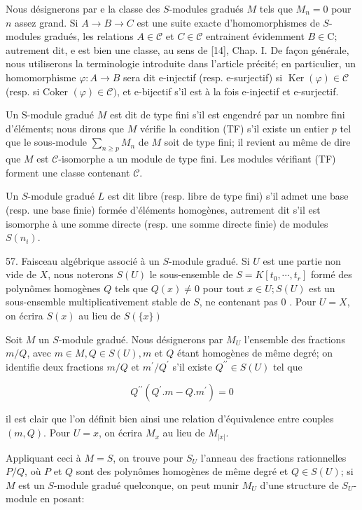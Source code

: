 Nous désignerons par e la classe des $S$-modules gradués $M$ tels que $M_{n}=0$ pour $n$ assez grand. Si $A \rightarrow B \rightarrow C$ est une suite exacte d'homomorphismes de $S$-modules gradués, les relations $A \in \mathcal{C}$ et $C \in \mathcal{C}$ entrainent évidemment $B \in \mathrm{C} ;$ autrement dit, e est bien une classe, au sens de [14], Chap. I. De façon générale, nous utiliserons la terminologie introduite dans l'article précité; en particulier, un homomorphisme $\varphi: A \rightarrow B$ sera dit e-injectif (resp. e-surjectif) si $\operatorname{Ker}(\varphi) \in \mathcal{C}$ (resp. si Coker $(\varphi) \in \mathcal{C})$, et e-bijectif s'il est à la fois e-injectif et e-surjectif.

Un S-module gradué $M$ est dit de type fini s'il est engendré par un nombre fini d'éléments; nous dirons que $M$ vérifie la condition (TF) s'il existe un entier $p$ tel que le sous-module $\sum_{n \geq p} M_{n}$ de $M$ soit de type fini; il revient au même de dire que $M$ est $\mathcal{C}$-isomorphe a un module de type fini. Les modules vérifiant (TF) forment une classe contenant $\mathcal{C}$.

Un $S$-module gradué $L$ est dit libre (resp. libre de type fini) s'il admet une base (resp. une base finie) formée d'éléments homogènes, autrement dit s'il est isomorphe à une somme directe (resp. une somme directe finie) de modules $S\left(n_{i}\right)$.

57. Faisceau algébrique associé à un $S$-module gradué. Si $U$ est une partie non vide de $X$, nous noterons $S(U)$ le sous-ensemble de $S=K\left[t_{0}, \cdots, t_{r}\right]$ formé des polynômes homogènes $Q$ tels que $Q(x) \neq 0$ pour tout $x \in U ; S(U)$ est un sous-ensemble multiplicativement stable de $S$, ne contenant pas 0 . Pour $U=X$, on écrira $S(x)$ au lieu de $S(\{x\})$

Soit $M$ un $S$-module gradué. Nous désignerons par $M_{U}$ l'ensemble des fractions $m / Q$, avec $m \in M, Q \in S(U), m$ et $Q$ étant homogènes de même degré; on identifie deux fractions $m / Q$ et $m^{\prime} / Q^{\prime}$ s'il existe $Q^{\prime \prime} \in S(U)$ tel que

$$
Q^{\prime \prime}\left(Q^{\prime} . m-Q . m^{\prime}\right)=0
$$

il est clair que l'on définit bien ainsi une relation d'équivalence entre couples $(m, Q)$. Pour $U=x$, on écrira $M_{x}$ au lieu de $M_{|x|}$.

Appliquant ceci à $M=S$, on trouve pour $S_{U}$ l'anneau des fractions rationnelles $P / Q$, où $P$ et $Q$ sont des polynômes homogènes de même degré et $Q \in S(U)$; si $M$ est un $S$-module gradué quelconque, on peut munir $M_{U}$ d'une structure de $S_{U}$-module en posant:

